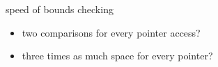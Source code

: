 
\begin{frame}{speed of bounds checking}
    \begin{itemize}
    \item two comparisons for every pointer access?
    \item three times as much space for every pointer?
    \end{itemize}
\end{frame}

